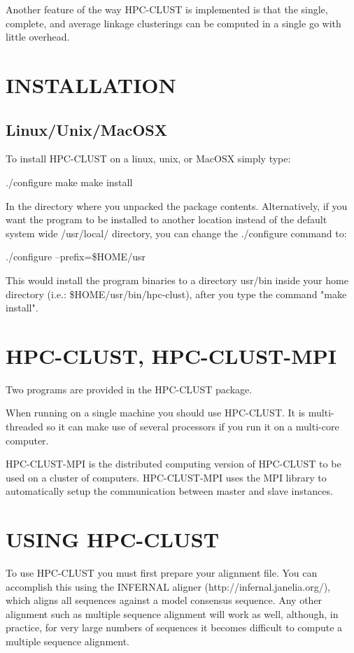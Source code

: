 \documentclass[10pt,a4paper]{article}
\begin{document}
Another feature of the way HPC-CLUST is implemented is that the single, complete, and average
linkage clusterings can be computed in a single go with little overhead.


\section{INSTALLATION}

\subsection{Linux/Unix/MacOSX}

To install HPC-CLUST on a linux, unix, or MacOSX simply type:

./configure
make
make install

In the directory where you unpacked the package contents.
Alternatively, if you want the program to be installed to another
location instead of the default system wide /usr/local/ directory,
you can change the ./configure command to:

./configure --prefix=\$HOME/usr

This would install the program binaries to a directory usr/bin inside
your home directory (i.e.: \$HOME/usr/bin/hpc-clust), after you type
the command "make install".


\section{HPC-CLUST, HPC-CLUST-MPI}

Two programs are provided in the HPC-CLUST package.

When running on a single machine you should use HPC-CLUST. It is multi-threaded
so it can make use of several processors if you run it on a multi-core computer.

HPC-CLUST-MPI is the distributed computing version of
HPC-CLUST to be used on a cluster of computers. HPC-CLUST-MPI uses the MPI library
to automatically setup the communication between master and slave instances.


\section{USING HPC-CLUST}

To use HPC-CLUST you must first prepare your alignment file. You can accomplish this
using the INFERNAL aligner (http://infernal.janelia.org/), which aligns all sequences
against a model consensus sequence. Any other alignment such as multiple sequence
alignment will work as well, although, in practice, for very large numbers of sequences
it becomes difficult to compute a multiple sequence alignment.
\end{document}
